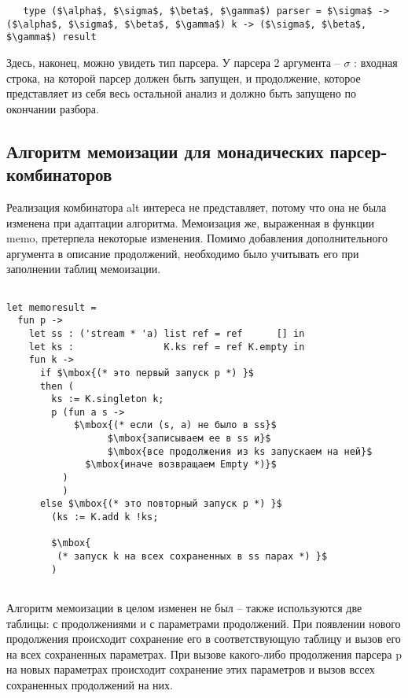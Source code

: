 \documentclass[conference]{IEEEtran}
\begin{document}
\begin{lstlisting}
   type ($\alpha$, $\sigma$, $\beta$, $\gamma$) parser = $\sigma$ -> ($\alpha$, $\sigma$, $\beta$, $\gamma$) k -> ($\sigma$, $\beta$, $\gamma$) result
  \end{lstlisting}

Здесь, наконец, можно увидеть тип парсера. У парсера 2 аргумента -- $\sigma$ : входная строка, на которой парсер должен быть запущен, и продолжение, которое представляет из себя весь остальной анализ и должно быть запущено по окончании разбора.

\subsection{Алгоритм мемоизации для монадических парсер-комбинаторов}

Реализация комбинатора alt интереса не представляет, потому что она не была изменена при адаптации алгоритма. Мемоизация же, выраженная в функции memo, претерпела некоторые изменения. Помимо добавления дополнительного аргумента в описание продолжений, необходимо было учитывать его при заполнении таблиц мемоизации. 

\begin{lstlisting}

let memoresult =
  fun p ->
    let ss : ('stream * 'a) list ref = ref      [] in
    let ks :                K.ks ref = ref K.empty in
    fun k ->
      if $\mbox{(* это первый запуск p *) }$
      then (
        ks := K.singleton k;
        p (fun a s -> 
            $\mbox{(* если (s, a) не было в ss}$
                  $\mbox{записываем ее в ss и}$
                  $\mbox{все продолжения из ks запускаем на ней}$
              $\mbox{иначе возвращаем Empty *)}$
          )
          )
      else $\mbox{(* это повторный запуск p *) }$
        (ks := K.add k !ks;
        
        $\mbox{
         (* запуск k на всех сохраненных в ss парах *) }$
        )
   
  \end{lstlisting}

Алгоритм мемоизации в целом изменен не был -- также используются две таблицы: с продолжениями и с параметрами продолжений. При появлении нового продолжения происходит сохранение его в соответствующую таблицу и вызов его на всех сохраненных параметрах. При вызове какого-либо продолжения парсера p на новых параметрах происходит сохранение этих параметров и вызов вссех сохраненных продолжений на них.
\end{document}
